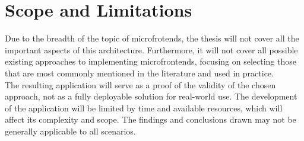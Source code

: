 \section{Scope and Limitations}
Due to the breadth of the topic of microfrotends, the thesis will not cover all the important aspects of this architecture. Furthermore, it will not cover all possible existing approaches to implementing microfrontends, focusing on selecting those that are most commonly mentioned in the literature and used in practice. \\

\noindent
The resulting application will serve as a proof of the validity of the chosen approach, not as a fully deployable solution for real-world use. The development of the application will be limited by time and available resources, which will affect its complexity and scope. The findings and conclusions drawn may not be generally applicable to all scenarios.